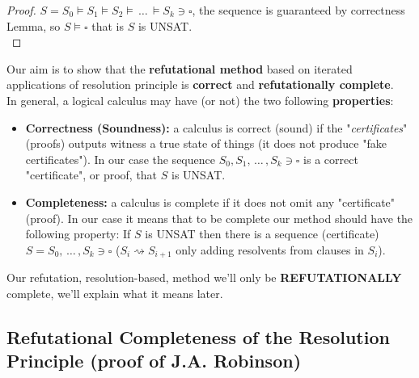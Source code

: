 \begin{proof}
	$S = S_0 \models S_1 \models S_2 \models \, \dots \, \models S_k \ni \square$, the sequence is guaranteed by correctness Lemma, so $S \models \square$ that is $S$ is UNSAT.\\
\end{proof}

\noindent
Our aim is to show that the \textbf{refutational method} based on iterated applications of resolution principle is \textbf{correct} and \textbf{refutationally complete}.\\

\noindent
In general, a logical calculus may have (or not) the two following \textbf{properties}:
\begin{itemize}
	\item \textbf{Correctness (Soundness):} a calculus is correct (sound) if the "\textit{certificates}" (proofs) outputs witness a true state of things (it does not produce "fake certificates"). In our case the sequence $S_0, S_1, \, \dots \, , S_k \ni \square$ is a correct "certificate", or proof, that $S$ is UNSAT.\\

	\item \textbf{Completeness:} a calculus is complete if it does not omit any "certificate" (proof). In our case it means that to be complete our method should have the following property: If $S$ is UNSAT then there is a sequence (certificate) $S = S_0, \, \dots \, , S_k \ni \square$ ($S_i \rightsquigarrow S_{i+1}$ only adding resolvents from clauses in $S_i$).
\end{itemize}

\noindent
Our refutation, resolution-based, method we'll only be \textbf{REFUTATIONALLY} complete, we'll explain what it means later.

\subsection{Refutational Completeness of the Resolution Principle (proof of J.A. Robinson)}

